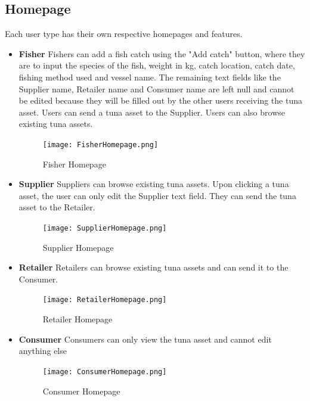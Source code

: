 \subsection{Homepage}
Each user type has their own respective homepages and features.
\begin{itemize}
	\item \textbf{Fisher}
	Fishers can add a fish catch using the "Add catch" button, where they are to input the species of the fish, weight in kg, catch location, catch date, fishing method used and vessel name. The remaining text fields like the Supplier name, Retailer name and Consumer name are left null and cannot be edited because they will be filled out by the other users receiving the tuna asset. Users can send a tuna asset to the Supplier. Users can also browse existing tuna assets. 
	
	\begin{figure}[H]
		\centering
		\texttt{[image: FisherHomepage.png]}
		\caption{Fisher Homepage}
		\label{fig:fisherhome_page}
	\end{figure}
	
	\item \textbf{Supplier}
	Suppliers can browse existing tuna assets. Upon clicking a tuna asset, the user can only edit the Supplier text field. They can send the tuna asset to the Retailer.
	
	\begin{figure}[H]
		\centering
		\texttt{[image: SupplierHomepage.png]}
		\caption{Supplier Homepage}
		\label{fig:supplierhome_page}
	\end{figure}
	
	\item \textbf{Retailer}
	Retailers can browse existing tuna assets and can send it to the Consumer.
	
	\begin{figure}[H]
		\centering
		\texttt{[image: RetailerHomepage.png]}
		\caption{Retailer Homepage}
		\label{fig:retailerhome_page}
	\end{figure}
	
	\item \textbf{Consumer}
	Consumers can only view the tuna asset and cannot edit anything else
	
	\begin{figure}[H]
		\centering
		\texttt{[image: ConsumerHomepage.png]}
		\caption{Consumer Homepage}
		\label{fig:consumerhome_page}
	\end{figure}
	
\end{itemize}

